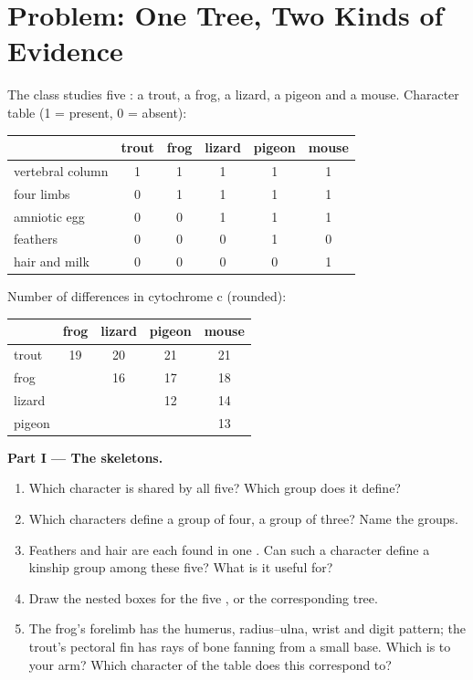 \section{Problem: One Tree, Two Kinds of Evidence}

\begin{problem}
\label{pb:g10:common-ancestry:1}
The class studies five : a trout, a frog, a lizard, a pigeon and
a mouse. Character table (1 = present, 0 = absent):

\begin{center}
\begin{tabular}{lccccc}
 & trout & frog & lizard & pigeon & mouse \\ \hline
vertebral column & 1 & 1 & 1 & 1 & 1 \\
four limbs & 0 & 1 & 1 & 1 & 1 \\
amniotic egg & 0 & 0 & 1 & 1 & 1 \\
feathers & 0 & 0 & 0 & 1 & 0 \\
hair and milk & 0 & 0 & 0 & 0 & 1 \\
\end{tabular}
\end{center}

Number of differences in cytochrome c (rounded):

\begin{center}
\begin{tabular}{lcccc}
 & frog & lizard & pigeon & mouse \\ \hline
trout & 19 & 20 & 21 & 21 \\
frog & & 16 & 17 & 18 \\
lizard & & & 12 & 14 \\
pigeon & & & & 13 \\
\end{tabular}
\end{center}

\medskip
\noindent\textbf{Part I --- The skeletons.}
\begin{enumerate}
  \item Which character is shared by all five? Which group does it
        define?
  \item Which characters define a group of four, a group of three?
        Name the groups.
  \item Feathers and hair are each found in one . Can such a
        character define a kinship group among these five? What is it
        useful for?
  \item Draw the nested boxes for the five , or the
        corresponding tree.
  \item The frog's forelimb has the humerus, radius--ulna, wrist and
        digit pattern; the trout's pectoral fin has rays of bone
        fanning from a small base. Which is  to your arm?
        Which character of the table does this correspond to?
\end{enumerate}


\end{problem}
